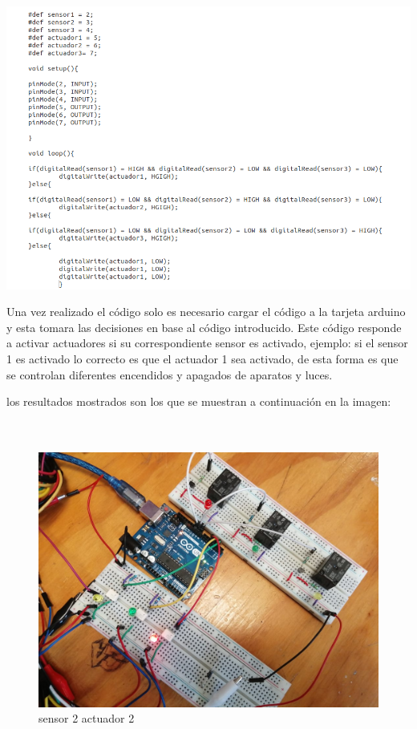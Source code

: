 \documentclass[11pt,a4paper]{article}
\begin{document}
\begin{center}
\includegraphics[scale=0.5]{3.png}
\end{center}


Una vez realizado el código solo es necesario cargar el código a la tarjeta arduino y esta tomara las decisiones en base al código introducido. Este código responde  a activar actuadores si su correspondiente sensor es activado, ejemplo: si el sensor 1 es activado lo correcto es que el actuador 1 sea activado, de esta forma es que se controlan diferentes encendidos y apagados de aparatos y luces.

los resultados mostrados son los que se muestran a continuación en la imagen:\\
\\
\\



\begin{figure}[h]
\begin{center}
\includegraphics[scale=0.150]{5.jpeg}
\caption{sensor 2 actuador 2}
\end{center}
\end{figure}
\end{document}
